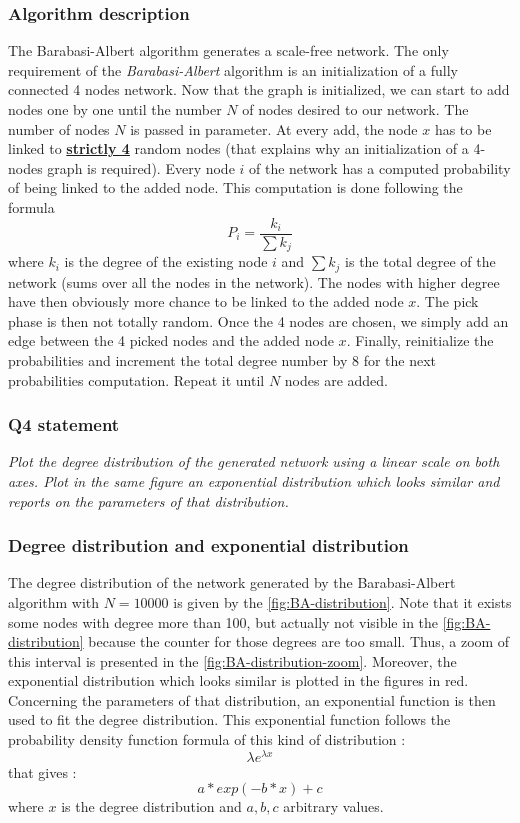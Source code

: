 \documentclass{article}
\begin{document}
\subsubsection*{Algorithm description}
The Barabasi-Albert algorithm generates a scale-free network. The only requirement of the \textit{Barabasi-Albert} algorithm is an initialization of a fully connected 4 nodes network. Now that the graph is initialized, we can start to add nodes one by one until the number $N$ of nodes desired to our network. The number of nodes  $N$ is passed in parameter. At every add, the node $x$ has to be linked to \textbf{\underline{strictly 4}} random nodes (that explains why an initialization of a 4-nodes graph is required). Every node $i$ of the network has a computed probability of being linked to the added node. This computation is done following the formula $$ P_{i} = \frac{k_{i}}{\sum k_{j}} $$ where $k_{i}$ is the degree of the existing node $i$ and $ \sum k_{j}$ is the total degree of the network (sums over all the nodes in the network). The nodes with higher degree have then obviously more chance to be linked to the added node $x$. The pick phase is then not totally random.  Once the 4 nodes are chosen, we simply add an edge between the 4 picked nodes and the added node $x$. Finally, reinitialize the probabilities and increment the total degree number by 8 for the next probabilities computation. Repeat it until $N$ nodes are added. 


\subsubsection{Q4 statement}
\textit{Plot the degree distribution of the generated network using a linear scale on both axes. Plot in the same figure an exponential distribution which looks similar and reports on the parameters of that distribution.}

\subsubsection*{Degree distribution and exponential distribution} 
The degree distribution of the network generated by the Barabasi-Albert algorithm with $N = 10000$ is given by the \autoref{fig:BA-distribution}. Note that it exists some nodes with degree more than 100, but actually not visible in the \autoref{fig:BA-distribution} because the counter for those degrees are too small. Thus, a zoom of this interval is presented in the \autoref{fig:BA-distribution-zoom}. Moreover, the exponential distribution which looks similar is plotted in the figures in red. Concerning the parameters of that distribution, an exponential function is then used to fit the degree distribution. This exponential function follows the probability density function formula of this kind of distribution : $$\lambda e^{\lambda x}$$ that gives : $$a*exp(-b*x)+c$$ where $x$ is the degree distribution and $a,b,c$ arbitrary values.   
\end{document}
